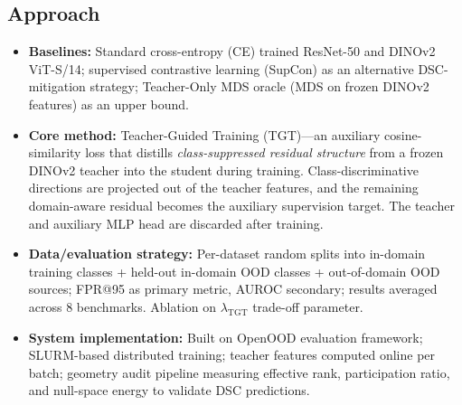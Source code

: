 \documentclass{article}
\begin{document}
\subsection{Approach}
\begin{itemize}
    \item \textbf{Baselines:} Standard cross-entropy (CE) trained ResNet-50 and DINOv2 ViT-S/14; supervised contrastive learning (SupCon) as an alternative DSC-mitigation strategy; Teacher-Only MDS oracle (MDS on frozen DINOv2 features) as an upper bound.
    \item \textbf{Core method:} Teacher-Guided Training (TGT)---an auxiliary cosine-similarity loss that distills \emph{class-suppressed residual structure} from a frozen DINOv2 teacher into the student during training. Class-discriminative directions are projected out of the teacher features, and the remaining domain-aware residual becomes the auxiliary supervision target. The teacher and auxiliary MLP head are discarded after training.
    \item \textbf{Data/evaluation strategy:} Per-dataset random splits into in-domain training classes + held-out in-domain OOD classes + out-of-domain OOD sources; FPR@95 as primary metric, AUROC secondary; results averaged across 8 benchmarks. Ablation on $\lambda_{\mathrm{TGT}}$ trade-off parameter.
    \item \textbf{System implementation:} Built on OpenOOD evaluation framework; SLURM-based distributed training; teacher features computed online per batch; geometry audit pipeline measuring effective rank, participation ratio, and null-space energy to validate DSC predictions.
\end{itemize}
\end{document}
